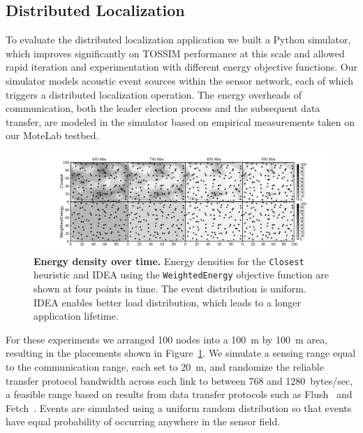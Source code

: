 \subsection{Distributed Localization}

To evaluate the distributed localization application we built a Python
simulator, which improves significantly on TOSSIM performance at this scale
and allowed rapid iteration and experimentation with different energy
objective functions. Our simulator models acoustic event sources within the
sensor network, each of which triggers a distributed localization operation.
The energy overheads of communication, both the leader election process and
the subsequent data transfer, are modeled in the simulator based on empirical
measurements taken on our MoteLab testbed.

\begin{figure}[t]
\begin{center}
\includegraphics[width=\hsize]{./idea/figs/graph_density_vs_time0406_2151.png}
\end{center}
\caption{\small{\textbf{Energy density over time.}
Energy densities for the \texttt{Closest} heuristic and IDEA using the
\texttt{WeightedEnergy} objective function are shown at four points in time. The
event distribution is uniform. IDEA enables better load distribution, which
leads to a longer application lifetime.}}
\label{fig-localizationdensityvtime}
\end{figure}

For these experiments we arranged 100 nodes into a 100~m by 100~m area,
resulting in the placements shown in
Figure~\ref{fig-localizationdensityvtime}. We simulate a sensing range equal
to the communication range, each set to 20~m, and randomize the reliable
transfer protocol bandwidth across each link to between 768 and
1280~bytes/sec, a feasible range based on results from data transfer
protocols such as Flush~\cite{flush-sensys07} and
Fetch~\cite{volcano-osdi06}.  Events are simulated using a uniform random
distribution so that events have equal probability of occurring anywhere in
the sensor field.

